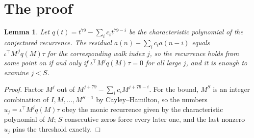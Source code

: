 \documentclass[11pt,a4paper]{article}
\theoremstyle{plain}
\newtheorem{lemma}[theorem]{Lemma}
\theoremstyle{definition}
\begin{document}
\section{The proof}

\begin{lemma}\label{lem:crit}
Let $q(t)=t^{79}-\sum_i c_it^{79-i}$ be the characteristic polynomial of the
conjectured recurrence. The residual $a(n)-\sum_ic_ia(n-i)$ equals
$\iota^{\!\top}M^{\,j}q(M)\tau$ for the corresponding walk index $j$, so the recurrence
holds from some point on if and only if $\iota^{\!\top}M^{j}q(M)\tau=0$ for all large $j$,
and it is enough to examine $j<S$.
\end{lemma}

\begin{proof}
Factor $M^{j}$ out of $M^{j+79}-\sum_ic_iM^{j+79-i}$. For the bound, $M^{S}$
is an integer combination of $I,M,\dots,M^{S-1}$ by Cayley--Hamilton, so the numbers
$u_j=\iota^{\!\top}M^{j}q(M)\tau$ obey the monic recurrence given by the characteristic
polynomial of $M$; $S$ consecutive zeros force every later one, and the last nonzero $u_j$
pins the threshold exactly.
\end{proof}
\end{document}
